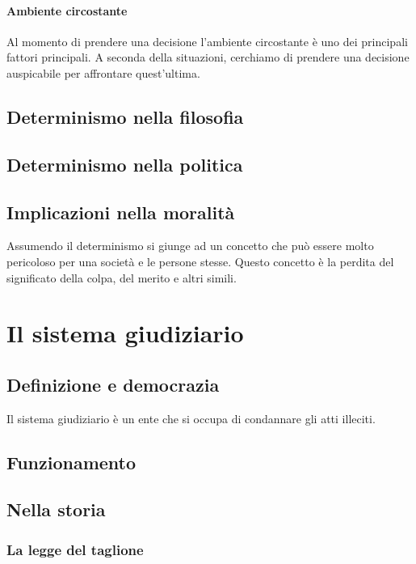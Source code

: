 \documentclass{article}
\begin{document}
\paragraph{Ambiente circostante}
Al momento di prendere una decisione l'ambiente circostante è uno dei principali fattori
principali. A seconda della situazioni, cerchiamo di prendere una decisione auspicabile
per affrontare quest'ultima.

\subsection{Determinismo nella filosofia}

\subsection{Determinismo nella politica}

\subsection{Implicazioni nella moralità}

Assumendo il determinismo si giunge ad un concetto che può essere molto pericoloso per una società
e le persone stesse. Questo concetto è la perdita del significato della colpa, del merito e altri simili.

\section{Il sistema giudiziario}

\subsection{Definizione e democrazia}

Il sistema giudiziario è un ente che si occupa di condannare gli atti illeciti.

\subsection{Funzionamento}

\subsection{Nella storia}

\subsubsection{La legge del taglione}
\end{document}
